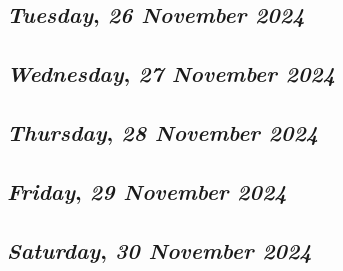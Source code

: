 \def\day{\textit{26 November 2024}}
\def\weekday{\textit{Tuesday}}
\subsection*{\weekday, \day}

\def\day{\textit{27 November 2024}}
\def\weekday{\textit{Wednesday}}
\subsection*{\weekday, \day}

\def\day{\textit{28 November 2024}}
\def\weekday{\textit{Thursday}}
\subsection*{\weekday, \day}

\def\day{\textit{29 November 2024}}
\def\weekday{\textit{Friday}}
\subsection*{\weekday, \day}

\def\day{\textit{30 November 2024}}
\def\weekday{\textit{Saturday}}
\subsection*{\weekday, \day}
